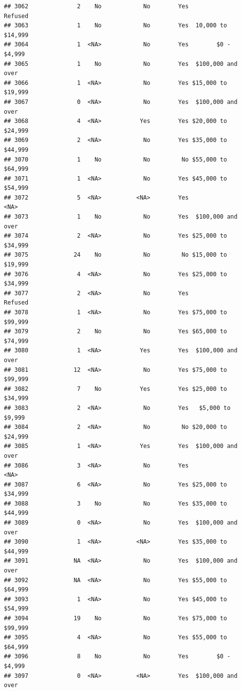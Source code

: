 \documentclass[man]{apa6}
\begin{document}
\begin{verbatim}
## 3062              2    No            No        Yes            Refused
## 3063              1    No            No        Yes  10,000 to $14,999
## 3064              1  <NA>            No        Yes        $0 - $4,999
## 3065              1    No            No        Yes  $100,000 and over
## 3066              1  <NA>            No        Yes $15,000 to $19,999
## 3067              0  <NA>            No        Yes  $100,000 and over
## 3068              4  <NA>           Yes        Yes $20,000 to $24,999
## 3069              2  <NA>            No        Yes $35,000 to $44,999
## 3070              1    No            No         No $55,000 to $64,999
## 3071              1  <NA>            No        Yes $45,000 to $54,999
## 3072              5  <NA>          <NA>        Yes               <NA>
## 3073              1    No            No        Yes  $100,000 and over
## 3074              2  <NA>            No        Yes $25,000 to $34,999
## 3075             24    No            No         No $15,000 to $19,999
## 3076              4  <NA>            No        Yes $25,000 to $34,999
## 3077              2  <NA>            No        Yes            Refused
## 3078              1  <NA>            No        Yes $75,000 to $99,999
## 3079              2    No            No        Yes $65,000 to $74,999
## 3080              1  <NA>           Yes        Yes  $100,000 and over
## 3081             12  <NA>            No        Yes $75,000 to $99,999
## 3082              7    No           Yes        Yes $25,000 to $34,999
## 3083              2  <NA>            No        Yes   $5,000 to $9,999
## 3084              2  <NA>            No         No $20,000 to $24,999
## 3085              1  <NA>           Yes        Yes  $100,000 and over
## 3086              3  <NA>            No        Yes               <NA>
## 3087              6  <NA>            No        Yes $25,000 to $34,999
## 3088              3    No            No        Yes $35,000 to $44,999
## 3089              0  <NA>            No        Yes  $100,000 and over
## 3090              1  <NA>          <NA>        Yes $35,000 to $44,999
## 3091             NA  <NA>            No        Yes  $100,000 and over
## 3092             NA  <NA>            No        Yes $55,000 to $64,999
## 3093              1  <NA>            No        Yes $45,000 to $54,999
## 3094             19    No            No        Yes $75,000 to $99,999
## 3095              4  <NA>            No        Yes $55,000 to $64,999
## 3096              8    No            No        Yes        $0 - $4,999
## 3097              0  <NA>          <NA>        Yes  $100,000 and over

\end{verbatim}
\end{document}
